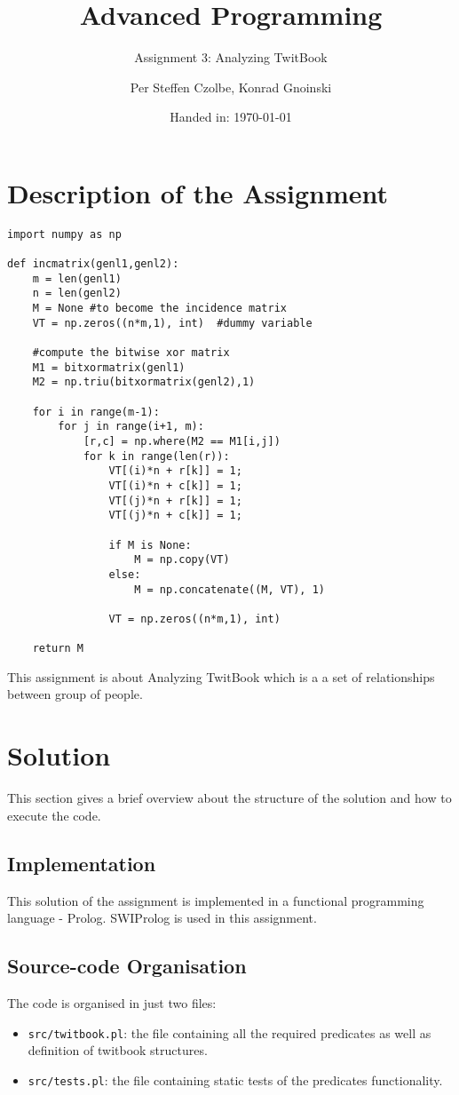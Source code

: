 \documentclass[11pt, a4paper]{article}
\author{Per Steffen Czolbe, Konrad Gnoinski}
\title{Advanced Programming}
\subtitle{Assignment 3: Analyzing TwitBook} %
\date{Handed in: \today}
\begin{document}
\maketitle

\tableofcontents


\section{Description of the Assignment}
\begin{verbatim}
import numpy as np
 
def incmatrix(genl1,genl2):
    m = len(genl1)
    n = len(genl2)
    M = None #to become the incidence matrix
    VT = np.zeros((n*m,1), int)  #dummy variable
 
    #compute the bitwise xor matrix
    M1 = bitxormatrix(genl1)
    M2 = np.triu(bitxormatrix(genl2),1)
 
    for i in range(m-1):
        for j in range(i+1, m):
            [r,c] = np.where(M2 == M1[i,j])
            for k in range(len(r)):
                VT[(i)*n + r[k]] = 1;
                VT[(i)*n + c[k]] = 1;
                VT[(j)*n + r[k]] = 1;
                VT[(j)*n + c[k]] = 1;
                
                if M is None:
                    M = np.copy(VT)
                else:
                    M = np.concatenate((M, VT), 1)
 
                VT = np.zeros((n*m,1), int)
 
    return M
\end{verbatim}

This assignment is about Analyzing TwitBook which is a a set of relationships between group of people. 

\section{Solution}
This section gives a brief overview about the structure of the solution and how to execute the code.

\subsection{Implementation}
This solution of the assignment is implemented in a functional programming language - Prolog. SWIProlog is used in this assignment. 

\subsection{Source-code Organisation}
The code is organised in just two files:
\begin{itemize}
	\item \texttt{src/twitbook.pl}: the file containing all the required predicates as well as definition of twitbook structures. 
	\item \texttt{src/tests.pl}: the file containing static tests of the predicates functionality.
\end{itemize}
\end{document}
